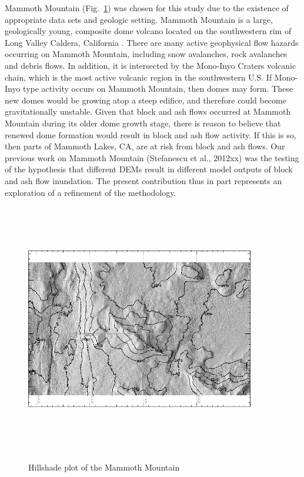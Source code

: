 \documentclass[12pt,letterpaper]{article}
\begin{document}
Mammoth Mountain (Fig.~\ref{fig:fig1}) was chosen for this study due to the existence of appropriate data sets and geologic setting. 
Mammoth Mountain is a large, geologically young, composite dome
volcano located on the southwestern rim of Long Valley Caldera,
California \citep{Bailey1989}.  There are many active geophysical flow hazards 
occurring on Mammoth Mountain, including snow avalanches, rock avalanches and
debris flows. In addition, it is intersected by the Mono-Inyo Craters
volcanic chain, which is the most active volcanic region in the
southwestern U.S.  If Mono-Inyo type activity occurs on Mammoth
Mountain, then domes may form.  These new domes would be growing atop
a steep edifice, and therefore could become gravitationally unstable.
Given that block and ash flows occurred at Mammoth Mountain during its
older dome growth stage, there is reason to believe that renewed dome
formation would result in block and ash flow activity. If this is so,
then parts of Mammoth Lakes, CA, are at risk from block and ash flows.
Our previous work on Mammoth Mountain (Stefanescu et al., 2012xx)
was the testing of the hypothesis that different DEMs result in
different model outputs of block and ash flow inundation.  The present contribution thus in part represents an exploration of a refinement of the methodology.

\begin{figure}[ht!]
\center
      \includegraphics[width=10cm,height=11cm,keepaspectratio]{figs/Topsar5.png}\\
  \caption{Hillshade plot of the Mammoth Mountain  }\label{fig:fig1}
\end{figure}
\end{document}
